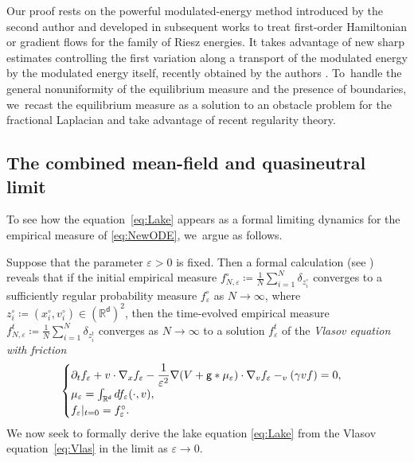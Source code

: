 \documentclass[10pt]{amsart}
\theoremstyle{plain}
\theoremstyle{definition}
\let\div\relax
\DeclareMathOperator{\div}{\mathrm{div}}
\newcommand{\R}{{\mathbb{R}}}
\let\ga\gamma
\let\vep\varepsilon
\let\p\partial
\renewcommand{\d}{\mathsf{d}}
\newcommand{\g}{{\mathsf{g}}}
\begin{document}
Our proof rests on the powerful modulated-energy method introduced by the second author \cite{Serfaty2017} and developed in subsequent works \cite{Duerinckx2016, Serfaty2020,BJW2019edp, NRS2021} to treat first-order Hamiltonian or gradient flows for the family of Riesz energies. It takes advantage of new sharp estimates controlling the first variation along a transport of the modulated energy by the modulated energy itself, recently obtained by the authors \cite{RS2022}. To~handle the general nonuniformity of the equilibrium measure and the presence of boundaries, we~recast the equilibrium measure as a solution to an obstacle problem for the fractional Laplacian and take advantage of recent regularity theory.

\subsection{The combined mean-field and quasineutral limit}\label{ssec:introMFQN}
To see how the equation~\eqref{eq:Lake} appears as a formal limiting dynamics for the empirical measure of \eqref{eq:NewODE}, we~argue as follows.

Suppose that the parameter $\vep>0$ is fixed. Then a formal calculation (\eg see \cite{Jabin2014}) reveals that if the initial empirical measure $f_{N,\vep}^\circ \coloneqq \frac1N\sum_{i=1}^N \delta_{z_i^\circ}$ converges to a sufficiently regular probability measure $f_{\vep}^\circ$ as $N\to\infty$, where $z_i^\circ\coloneqq (x_i^\circ,v_i^\circ) \in (\R^\d)^2$, then the time-evolved empirical measure $f_{N,\vep}^t \coloneqq \frac{1}{N}\sum_{i=1}^N \delta_{z_i^t}$ converges as $N\to\infty$ to a solution $f_\vep^t$ of the \emph{Vlasov equation with friction}
\begin{equation}\label{eq:Vlas}
\begin{cases}
\p_t f_\vep+v\cdot\nabla_x f_\vep-\dfrac{1}{\vep^2}\nabla(V+\g\ast\mu_\vep)\cdot\nabla_v f_\vep - \div_v(\ga vf)=0,\\
\mu_\vep = \int_{\R^\d}df_\vep(\cdot,v), \\
f_\vep|_{t=0} = f_\vep^\circ.
\end{cases}
\end{equation}
We now seek to {formally} derive the lake equation \eqref{eq:Lake} from the Vlasov equation~\eqref{eq:Vlas} in the limit as $\vep\to0$.
\end{document}
